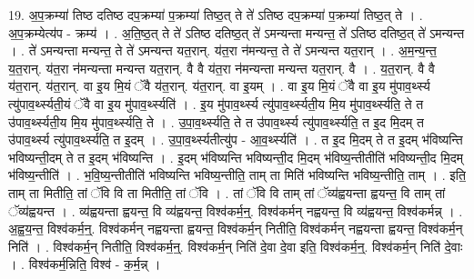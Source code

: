 \documentclass[17pt]{extarticle}
\begin{document}
19. अ॒प॒क्रम्या॑ तिष्ठ दतिष्ठ दप॒क्रम्या॑ प॒क्रम्या॑ तिष्ठ॒त् ते ते॑ ऽतिष्ठ दप॒क्रम्या॑ प॒क्रम्या॑ तिष्ठ॒त् ते । . अ॒प॒क्रम्येत्य॑प - क्रम्य॑ । . अ॒ति॒ष्ठ॒त् ते ते॑ ऽतिष्ठ दतिष्ठ॒त् ते॑ ऽमन्यन्ता मन्यन्त॒ ते॑ ऽतिष्ठ दतिष्ठ॒त् ते॑ ऽमन्यन्त । . ते॑ ऽमन्यन्ता मन्यन्त॒ ते ते॑ ऽमन्यन्त यत॒रान्. य॑त॒रा न॑मन्यन्त॒ ते ते॑ ऽमन्यन्त यत॒रान् । . अ॒म॒न्य॒न्त॒ य॒त॒रान्. य॑त॒रा न॑मन्यन्ता मन्यन्त यत॒रान्. वै वै य॑त॒रा न॑मन्यन्ता मन्यन्त यत॒रान्. वै । . य॒त॒रान्. वै वै य॑त॒रान्. य॑त॒रान्. वा इ॒य मि॒यं ॅवै य॑त॒रान्. य॑त॒रान्. वा इ॒यम् । . वा इ॒य मि॒यं ॅवै वा इ॒य मु॑पाव॒र्थ्स्य त्यु॑पाव॒र्थ्स्यती॒यं ॅवै वा इ॒य मु॑पाव॒र्थ्स्यति॑ । . इ॒य मु॑पाव॒र्थ्स्य त्यु॑पाव॒र्थ्स्यती॒य मि॒य मु॑पाव॒र्थ्स्यति॒ ते त उ॑पाव॒र्थ्स्यती॒य मि॒य मु॑पाव॒र्थ्स्यति॒ ते । . उ॒पा॒व॒र्थ्स्यति॒ ते त उ॑पाव॒र्थ्स्य त्यु॑पाव॒र्थ्स्यति॒ त इ॒द मि॒दम् त उ॑पाव॒र्थ्स्य त्यु॑पाव॒र्थ्स्यति॒ त इ॒दम् । . उ॒पा॒व॒र्थ्स्यतीत्यु॑प - आ॒व॒र्थ्स्यति॑ । . त इ॒द मि॒दम् ते त इ॒दम् भ॑विष्यन्ति भविष्यन्ती॒दम् ते त इ॒दम् भ॑विष्यन्ति । . इ॒दम् भ॑विष्यन्ति भविष्यन्ती॒द मि॒दम् भ॑विष्य॒न्तीतीति॑ भविष्यन्ती॒द मि॒दम् भ॑विष्य॒न्तीति॑ । . भ॒वि॒ष्य॒न्तीतीति॑ भविष्यन्ति भविष्य॒न्तीति॒ ताम् ता मिति॑ भविष्यन्ति भविष्य॒न्तीति॒ ताम् । . इति॒ ताम् ता मितीति॒ तां ॅवि वि ता मितीति॒ तां ॅवि । . तां ॅवि वि ताम् तां ॅव्य॑ह्वयन्ता ह्वयन्त॒ वि ताम् तां ॅव्य॑ह्वयन्त । . व्य॑ह्वयन्ता ह्वयन्त॒ वि व्य॑ह्वयन्त॒ विश्व॑कर्म॒न्॒. विश्व॑कर्मन् नह्वयन्त॒ वि व्य॑ह्वयन्त॒ विश्व॑कर्मन्न् । . अ॒ह्व॒य॒न्त॒ विश्व॑कर्म॒न्॒. विश्व॑कर्मन् नह्वयन्ता ह्वयन्त॒ विश्व॑कर्म॒न् नितीति॒ विश्व॑कर्मन् नह्वयन्ता ह्वयन्त॒ विश्व॑कर्म॒न् निति॑ । . विश्व॑कर्म॒न् नितीति॒ विश्व॑कर्म॒न्॒. विश्व॑कर्म॒न् निति॑ दे॒वा दे॒वा इति॒ विश्व॑कर्म॒न्॒. विश्व॑कर्म॒न् निति॑ दे॒वाः । . विश्व॑कर्म॒न्निति॒ विश्व॑ - क॒र्म॒न्न् । \newline
\end{document}
